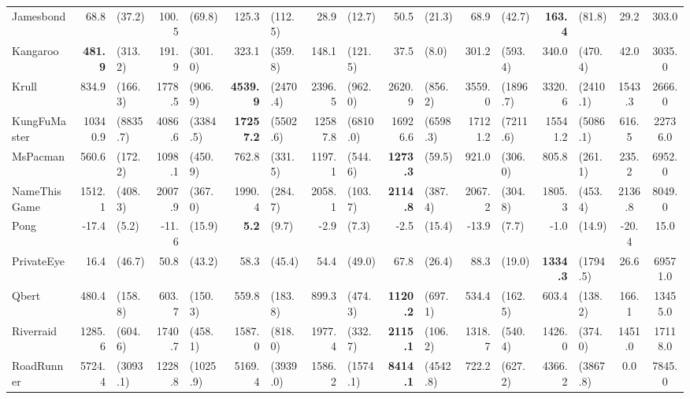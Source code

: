 \begin{landscape}
\begin{changemargin}{0cm}{0cm}
\begin{center}
\begin{table}[!htbp]
\begin{tabular}{l|rl|rl|rl|rl|rl|rl|rl|c|c}
Jamesbond      &     68.8 &    (37.2) &    100.5 &     (69.8) &    125.3 &    (112.5) &     28.9 &     (12.7) &     50.5 &     (21.3) &     68.9 &     (42.7) &\textbf{    163.4 }&     (81.8) &     29.2 &    303.0 \\
Kangaroo       &\textbf{    481.9 }&   (313.2) &    191.9 &    (301.0) &    323.1 &    (359.8) &    148.1 &    (121.5) &     37.5 &      (8.0) &    301.2 &    (593.4) &    340.0 &    (470.4) &     42.0 &   3035.0 \\
Krull          &    834.9 &   (166.3) &   1778.5 &    (906.9) &\textbf{   4539.9 }&   (2470.4) &   2396.5 &    (962.0) &   2620.9 &    (856.2) &   3559.0 &   (1896.7) &   3320.6 &   (2410.1) &   1543.3 &   2666.0 \\
KungFuMaster   &  10340.9 &  (8835.7) &   4086.6 &   (3384.5) &\textbf{  17257.2 }&   (5502.6) &  12587.8 &   (6810.0) &  16926.6 &   (6598.3) &  17121.2 &   (7211.6) &  15541.2 &   (5086.1) &    616.5 &  22736.0 \\
MsPacman       &    560.6 &   (172.2) &   1098.1 &    (450.9) &    762.8 &    (331.5) &   1197.1 &    (544.6) &\textbf{   1273.3 }&     (59.5) &    921.0 &    (306.0) &    805.8 &    (261.1) &    235.2 &   6952.0 \\
NameThisGame   &   1512.1 &   (408.3) &   2007.9 &    (367.0) &   1990.4 &    (284.7) &   2058.1 &    (103.7) &\textbf{   2114.8 }&    (387.4) &   2067.2 &    (304.8) &   1805.3 &    (453.4) &   2136.8 &   8049.0 \\
Pong           &    -17.4 &     (5.2) &    -11.6 &     (15.9) &\textbf{      5.2 }&      (9.7) &     -2.9 &      (7.3) &     -2.5 &     (15.4) &    -13.9 &      (7.7) &     -1.0 &     (14.9) &    -20.4 &     15.0 \\
PrivateEye     &     16.4 &    (46.7) &     50.8 &     (43.2) &     58.3 &     (45.4) &     54.4 &     (49.0) &     67.8 &     (26.4) &     88.3 &     (19.0) &\textbf{   1334.3 }&   (1794.5) &     26.6 &  69571.0 \\
Qbert          &    480.4 &   (158.8) &    603.7 &    (150.3) &    559.8 &    (183.8) &    899.3 &    (474.3) &\textbf{   1120.2 }&    (697.1) &    534.4 &    (162.5) &    603.4 &    (138.2) &    166.1 &  13455.0 \\
Riverraid      &   1285.6 &   (604.6) &   1740.7 &    (458.1) &   1587.0 &    (818.0) &   1977.4 &    (332.7) &\textbf{   2115.1 }&    (106.2) &   1318.7 &    (540.4) &   1426.0 &    (374.0) &   1451.0 &  17118.0 \\
RoadRunner     &   5724.4 &  (3093.1) &   1228.8 &   (1025.9) &   5169.4 &   (3939.0) &   1586.2 &   (1574.1) &\textbf{   8414.1 }&   (4542.8) &    722.2 &    (627.2) &   4366.2 &   (3867.8) &      0.0 &   7845.0 \\

\end{tabular}
\end{table}
\end{center}
\end{changemargin}
\end{landscape}
